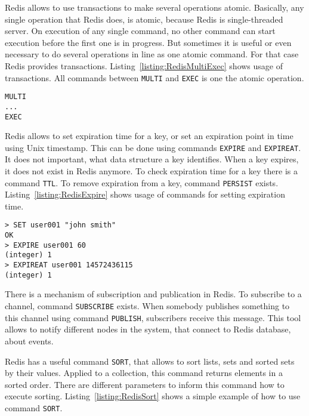 
Redis allows to use transactions to make several operations atomic.
Basically, any single operation that Redis does, is atomic, because Redis is single-threaded server.
On execution of any single command, no other command can start execution before the first one is in progress.
But sometimes it is useful or even necessary to do several operations in line as one atomic command.
For that case Redis provides transactions.
Listing~\ref{listing:RedisMultiExec} shows usage of transactions.
All commands between \lstinline{MULTI} and \lstinline{EXEC} is one the atomic operation.

\begin{lstlisting}[float=h, caption=Usage of commands MULTI and EXEC., label=listing:RedisMultiExec]
MULTI
...
EXEC
\end{lstlisting}

Redis allows to set expiration time for a key, or set an expiration point in time using Unix timestamp.
This can be done using commands \lstinline{EXPIRE} and \lstinline{EXPIREAT}.
It does not important, what data structure a key identifies.
When a key expires, it does not exist in Redis anymore.
To check expiration time for a key there is a command \lstinline{TTL}.
To remove expiration from a key, command \lstinline{PERSIST} exists.
Listing~\ref{listing:RedisExpire} shows usage of commands for setting expiration time.

\begin{lstlisting}[float=h, caption=Usage of commands EXPIRE and EXPIREAT., label=listing:RedisExpire]
> SET user001 "john smith"
OK
> EXPIRE user001 60
(integer) 1
> EXPIREAT user001 14572436115
(integer) 1
\end{lstlisting}

There is a mechanism of subscription and publication in Redis.
To subscribe to a channel, command \lstinline{SUBSCRIBE} exists.
When somebody publishes something to this channel using command \lstinline{PUBLISH}, subscribers receive this message.
This tool allows to notify different nodes in the system, that connect to Redis database, about events.

Redis has a useful command \lstinline{SORT}, that allows to sort lists, sets and sorted sets by their values.
Applied to a collection, this command returns elements in a sorted order.
There are different parameters to inform this command how to execute sorting.
Listing~\ref{listing:RedisSort} shows a simple example of how to use command \lstinline{SORT}.

